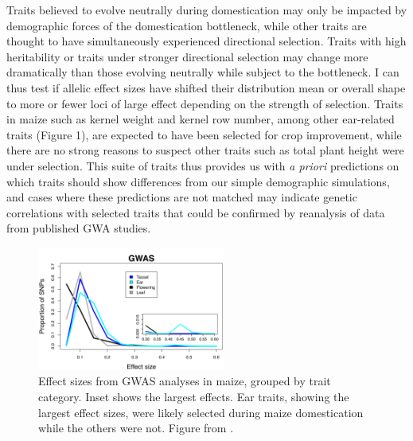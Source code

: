 Traits believed to evolve neutrally during domestication may only be impacted by demographic forces of the domestication bottleneck, while other traits are thought to have simultaneously experienced directional selection. Traits with high heritability or traits under stronger directional selection may change more dramatically than those evolving neutrally while subject to the bottleneck. I can thus test if allelic effect sizes have shifted their distribution mean or overall shape to more or fewer loci of large effect \citep{Chevin:2008} depending on the strength of selection. 
Traits in maize such as kernel weight and kernel row number, among other ear-related traits (Figure 1), are expected to have been selected for crop improvement, while there are no strong reasons to suspect other traits such as total plant height were under selection. This suite of traits thus provides us with \emph{a priori} predictions on which traits should show differences from our simple demographic simulations, and cases where these predictions are not matched may indicate genetic correlations with selected traits that could be confirmed by reanalysis of data from published GWA studies. 

\begin{figure}
\vspace{-2ex}
\centering
   \includegraphics[width=0.55\textwidth]{Figure2_Brownetal2011.png}
  \caption{Effect sizes from GWAS analyses in maize, grouped by trait category. Inset shows the largest effects. Ear traits, showing the largest effect sizes, were likely selected during maize domestication while the others were not. Figure from \citealt{Brown:2011}.}
  \label{fig:model}
\vspace{-2ex}
\end{figure}
	
\vspace{-2ex}

